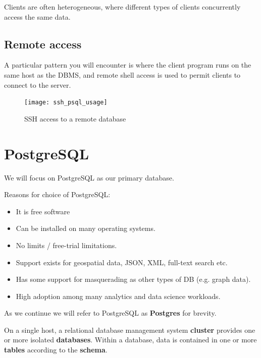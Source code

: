 \documentclass[slides]{pgnotes}
\begin{document}
Clients are often heterogeneous, where different types of clients concurrently access the same data.



\subsection{Remote access}

A particular pattern you will encounter is where the client program runs on the same host as the DBMS, and remote shell access is used to permit clients to connect to the server.

\begin{figure}[htbp]
  \centering
  \texttt{[image: ssh\_psql\_usage]}
  \caption{SSH access to a remote database}
  \label{fig:ssh-psql-usage}
\end{figure}





\section{PostgreSQL}\label{sec:postgresql}

We will focus on PostgreSQL as our primary database.


\begin{greenbox}{Reasons for choice of PostgreSQL:}
\begin{itemize}
\item
  It is free software
\item
  Can be installed on many operating systems.
\item
  No limits / free-trial limitations.
\item
  Support exists for geospatial data, JSON, XML, full-text search etc.
\item
  Has some support for masquerading as other types of DB (e.g. graph data).
\item
  High adoption among many analytics and data science workloads.
\end{itemize}
\end{greenbox}

As we continue we will refer to PostgreSQL as \textbf{Postgres} for brevity.

On a single host, a relational database management system \textbf{cluster} provides one or more isolated \textbf{databases}.
Within a database, data is contained in one or more \textbf{tables} according to the \textbf{schema}.
\end{document}
